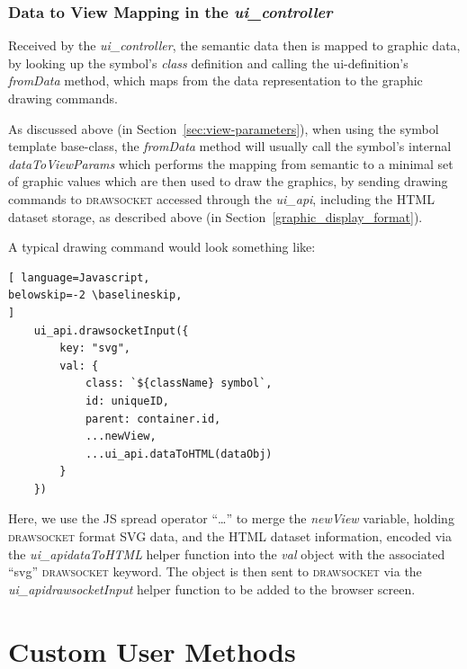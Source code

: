 \documentclass{article}
\def\drawsocket{\textsc{drawsocket}\xspace}
\def\uicontroller{\textit{ui\_controller}\xspace}
\def\uiapi{\textit{ui\_api}\xspace}
\begin{document}

\subsubsection*{Data to View Mapping in the \uicontroller}

Received by the \uicontroller, the semantic data then is mapped to graphic data, by looking up the symbol's \textit{class} definition and calling the ui-definition's \textit{fromData} method, which maps from the data representation to the graphic drawing commands. 

As discussed above (in Section~\ref{sec:view-parameters}), when using the symbol template base-class, the \textit{fromData} method will usually call the symbol's internal \textit{dataToViewParams} which performs the mapping from semantic to a minimal set of graphic values which are then used to draw the graphics, by sending drawing commands to \drawsocket accessed through the \uiapi, including the HTML dataset storage, as described above (in Section~\ref{graphic_display_format}).

A typical drawing command would look something like:

\begin{lstlisting}[ language=Javascript,
belowskip=-2 \baselineskip,
]
    ui_api.drawsocketInput({
        key: "svg",
        val: {
            class: `${className} symbol`,
            id: uniqueID,
            parent: container.id,
            ...newView, 
            ...ui_api.dataToHTML(dataObj)
        }
    }) 
\end{lstlisting}

\noindent
Here, we use the JS spread operator ``\ldots'' to merge the \textit{newView} variable, holding \drawsocket format SVG data, and the HTML dataset information, encoded via the \uiapi \textit{dataToHTML} helper function into the \textit{val} object with the associated ``svg'' \drawsocket keyword. The object is then sent to \drawsocket via the \uiapi \textit{drawsocketInput} helper function to be added to the browser screen.


\section{Custom User Methods}\label{sec:user_methods}
\end{document}
